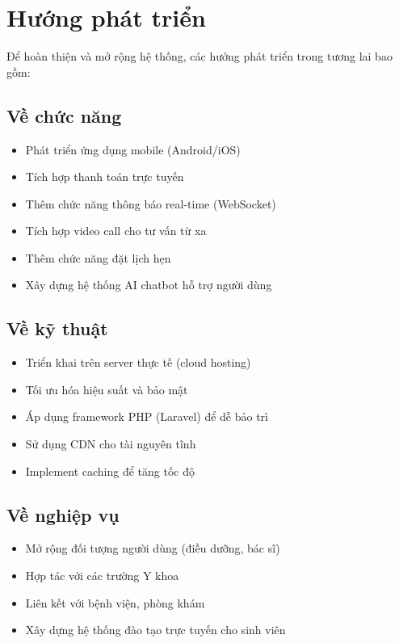 \documentclass[a4paper,12pt]{report}
\begin{document}
\section{Hướng phát triển}

Để hoàn thiện và mở rộng hệ thống, các hướng phát triển trong tương lai bao gồm:

\subsection{Về chức năng}
\begin{itemize}
    \item Phát triển ứng dụng mobile (Android/iOS)
    \item Tích hợp thanh toán trực tuyến
    \item Thêm chức năng thông báo real-time (WebSocket)
    \item Tích hợp video call cho tư vấn từ xa
    \item Thêm chức năng đặt lịch hẹn
    \item Xây dựng hệ thống AI chatbot hỗ trợ người dùng
\end{itemize}

\subsection{Về kỹ thuật}
\begin{itemize}
    \item Triển khai trên server thực tế (cloud hosting)
    \item Tối ưu hóa hiệu suất và bảo mật
    \item Áp dụng framework PHP (Laravel) để dễ bảo trì
    \item Sử dụng CDN cho tài nguyên tĩnh
    \item Implement caching để tăng tốc độ
\end{itemize}

\subsection{Về nghiệp vụ}
\begin{itemize}
    \item Mở rộng đối tượng người dùng (điều dưỡng, bác sĩ)
    \item Hợp tác với các trường Y khoa
    \item Liên kết với bệnh viện, phòng khám
    \item Xây dựng hệ thống đào tạo trực tuyến cho sinh viên
\end{itemize}
\end{document}
